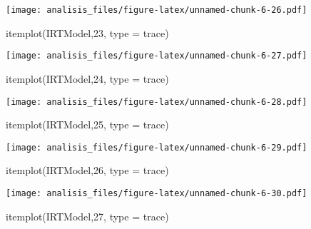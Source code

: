 \documentclass[
]{article}
\newenvironment{Shaded}{\begin{snugshade}}{\end{snugshade}}
\newcommand{\AttributeTok}[1]{\textcolor[rgb]{0.77,0.63,0.00}{#1}}
\newcommand{\DecValTok}[1]{\textcolor[rgb]{0.00,0.00,0.81}{#1}}
\newcommand{\FunctionTok}[1]{\textcolor[rgb]{0.00,0.00,0.00}{#1}}
\newcommand{\NormalTok}[1]{#1}
\newcommand{\StringTok}[1]{\textcolor[rgb]{0.31,0.60,0.02}{#1}}
\begin{document}
\texttt{[image: analisis\_files/figure-latex/unnamed-chunk-6-26.pdf]}

\begin{Shaded}
\begin{Highlighting}[]
\FunctionTok{itemplot}\NormalTok{(IRTModel,}\DecValTok{23}\NormalTok{, }\AttributeTok{type =} \StringTok{\textquotesingle{}trace\textquotesingle{}}\NormalTok{)}
\end{Highlighting}
\end{Shaded}

\texttt{[image: analisis\_files/figure-latex/unnamed-chunk-6-27.pdf]}

\begin{Shaded}
\begin{Highlighting}[]
\FunctionTok{itemplot}\NormalTok{(IRTModel,}\DecValTok{24}\NormalTok{, }\AttributeTok{type =} \StringTok{\textquotesingle{}trace\textquotesingle{}}\NormalTok{)}
\end{Highlighting}
\end{Shaded}

\texttt{[image: analisis\_files/figure-latex/unnamed-chunk-6-28.pdf]}

\begin{Shaded}
\begin{Highlighting}[]
\FunctionTok{itemplot}\NormalTok{(IRTModel,}\DecValTok{25}\NormalTok{, }\AttributeTok{type =} \StringTok{\textquotesingle{}trace\textquotesingle{}}\NormalTok{)}
\end{Highlighting}
\end{Shaded}

\texttt{[image: analisis\_files/figure-latex/unnamed-chunk-6-29.pdf]}

\begin{Shaded}
\begin{Highlighting}[]
\FunctionTok{itemplot}\NormalTok{(IRTModel,}\DecValTok{26}\NormalTok{, }\AttributeTok{type =} \StringTok{\textquotesingle{}trace\textquotesingle{}}\NormalTok{)}
\end{Highlighting}
\end{Shaded}

\texttt{[image: analisis\_files/figure-latex/unnamed-chunk-6-30.pdf]}

\begin{Shaded}
\begin{Highlighting}[]
\FunctionTok{itemplot}\NormalTok{(IRTModel,}\DecValTok{27}\NormalTok{, }\AttributeTok{type =} \StringTok{\textquotesingle{}trace\textquotesingle{}}\NormalTok{)}
\end{Highlighting}
\end{Shaded}
\end{document}

